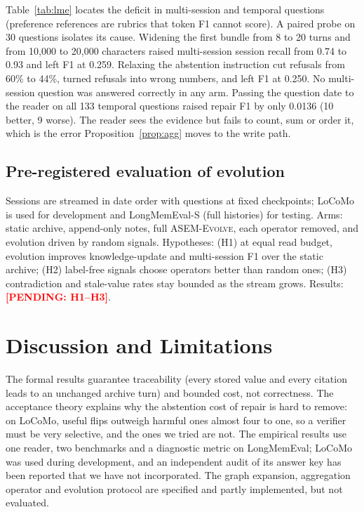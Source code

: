 \documentclass[10pt]{article}
\theoremstyle{plain}
\theoremstyle{definition}
\theoremstyle{remark}
\newcommand{\evolve}{\textsc{ASEM-Evolve}}
\newcommand{\pending}[1]{\textcolor{red}{\textbf{[PENDING: #1]}}}
\begin{document}
Table~\ref{tab:lme} locates the deficit in multi-session and temporal questions
(preference references are rubrics that token F1 cannot score). A paired probe on
30 questions isolates its cause. Widening the first bundle from 8 to 20 turns and
from 10,000 to 20,000 characters raised multi-session session recall from 0.74 to
0.93 and left F1 at 0.259. Relaxing the abstention instruction cut refusals from
60\% to 44\%, turned refusals into wrong numbers, and left F1 at 0.250. No
multi-session question was answered correctly in any arm. Passing the question date
to the reader on all 133 temporal questions raised repair F1 by only 0.0136 (10
better, 9 worse). The reader sees the evidence but fails to count, sum or order it,
which is the error Proposition~\ref{prop:agg} moves to the write path.

\subsection{Pre-registered evaluation of evolution}

Sessions are streamed in date order with questions at fixed checkpoints; LoCoMo is
used for development and LongMemEval-S (full histories) for testing. Arms: static
archive, append-only notes, full \evolve{}, each operator removed, and evolution
driven by random signals. Hypotheses: (H1) at equal read budget, evolution improves
knowledge-update and multi-session F1 over the static archive; (H2) label-free
signals choose operators better than random ones; (H3) contradiction and stale-value
rates stay bounded as the stream grows. Results: \pending{H1--H3}.

\section{Discussion and Limitations}
\label{sec:discussion}

The formal results guarantee traceability (every stored value and every citation
leads to an unchanged archive turn) and bounded cost, not correctness. The
acceptance theory explains why the abstention cost of repair is hard to remove: on
LoCoMo, useful flips outweigh harmful ones almost four to one, so a verifier must be
very selective, and the ones we tried are not. The empirical results use one reader,
two benchmarks and a diagnostic metric on LongMemEval; LoCoMo was used during
development, and an independent audit of its answer key has been reported that we
have not incorporated. The graph expansion, aggregation operator and evolution
protocol are specified and partly implemented, but not evaluated.
\end{document}
